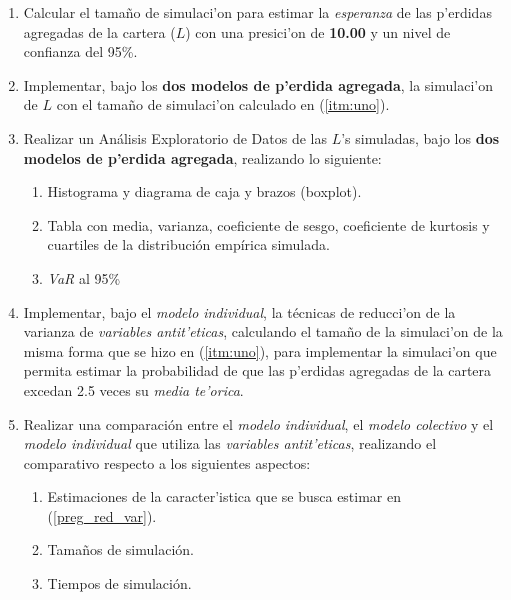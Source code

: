\documentclass[10pt, oneside]{article}
\begin{document}
\begin{enumerate}

\item \label{itm:uno} 
Calcular el tama\~no de simulaci'on para estimar la \emph{esperanza} de las p'erdidas agregadas de la cartera ($L$) con una presici'on de \textbf{10.00} y un nivel de confianza del 95\%.

\item
Implementar, bajo los \textbf{dos modelos de p'erdida agregada}, la simulaci'on de $L$ con el tama\~no de simulaci'on calculado en (\ref{itm:uno}).

\item
Realizar un An\'alisis Exploratorio de Datos de las $L$'s simuladas, bajo los \textbf{dos modelos de p'erdida agregada}, realizando lo siguiente:

\begin{enumerate}

\item
Histograma y diagrama de caja y brazos (boxplot).

\item
Tabla con media, varianza, coeficiente de sesgo, coeficiente de kurtosis y cuartiles de la distribuci\'on emp\'irica simulada.

\item
\emph{VaR} al 95\%

\end{enumerate}

\item \label{preg_red_var}
Implementar, bajo el \emph{modelo individual}, la t\'ecnicas de reducci'on de la varianza de \emph{variables antit'eticas}, calculando el tama\~no de la simulaci'on de la misma forma que se hizo en (\ref{itm:uno}), para implementar la simulaci'on que permita estimar la probabilidad de que las p'erdidas agregadas de la cartera excedan 2.5 veces su \emph{media te'orica}.

\item
Realizar una comparaci\'on entre el \emph{modelo individual}, el \emph{modelo colectivo} y el \emph{modelo individual} que utiliza las \emph{variables antit'eticas}, realizando el comparativo respecto a los siguientes aspectos:

\begin{enumerate}
\item Estimaciones de la caracter'istica que se busca estimar en (\ref{preg_red_var}).
\item Tama\~nos de simulaci\'on.
\item Tiempos de simulaci\'on.
\end{enumerate}

\end{enumerate}
\end{document}

